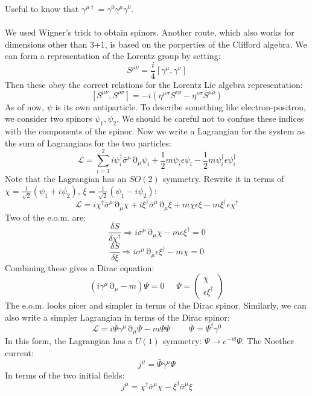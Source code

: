 \documentclass[12 pt]{article}
\DeclareMathOperator {\p} {\partial}
\begin{document}
Useful to know that $\gamma^{\mu \dagger} = \gamma^0 \gamma^{\mu} \gamma^0$.
\\
\\
We used Wigner's trick to obtain spinors. Another route, which also works for dimensions other than 3+1, is based on the porperties of the Clifford algebra. We can form a representation of the Lorentz group by setting:
\[      S^{\mu \nu} = \frac{i}{4} [ \gamma^{\mu} , \gamma^{\nu} ]     \]
Then these obey the correct relations for the Lorentz Lie algebra representation:
\[      [S^{\mu\nu}, S^{\rho \sigma} ] = -i ( \eta^{\mu \sigma} S^{\nu \rho} - \eta^{\nu \sigma} S^{\mu \rho} )       \]
As of now, $\psi$ is its own antiparticle. To describe something like electron-positron, we consider two spinors $\psi_1, \psi_2$. We should be careful not to confuse these indices with the components of the spinor. Now we write a Lagrangian for the system as the sum of Lagrangians for the two particles:
\[      \mathcal{L} = \sum_{i=1}^2 i \psi_i^{\dagger} \bar \sigma^{\mu} \p_{\mu} \psi_i + \frac{1}{2} m \psi_i \epsilon \psi_i - \frac{1}{2} m \psi_i^{\dagger} \epsilon \psi_i^{\dagger}          \]
Note that the Lagrangian has an $SO(2)$ symmetry. Rewrite it in terms of $\chi = \frac{1}{\sqrt{2}} (\psi_1 + i \psi_2)$, $\xi = \frac{1}{\sqrt{2}} (\psi_1 - i \psi_2)$:
\[    \mathcal{L} = i \chi^{\dagger} \bar \sigma^{\mu} \p_{\mu} \chi + i \xi^{\dagger} \bar \sigma^{\mu} \p_{\mu} \xi + m \chi \epsilon \xi - m \xi^{\dagger} \epsilon \chi^{\dagger}     \]
Two of the e.o.m. are:
\[    \frac{\delta S}{\delta \chi^{\dagger}} \Rightarrow i \bar \sigma^{\mu} \p_{\mu} \chi - m \epsilon \xi^{\dagger} = 0   \]
\[    \frac{\delta S}{\delta \xi}   \Rightarrow i \sigma^{\mu} \p_{\mu} \epsilon \xi^{\dagger} - m \chi = 0           \]
Combining these gives a Dirac equation:
\[    (i \gamma^{\mu} \p_{\mu} - m )  \Psi = 0 \;\;\;\;\;    \Psi = \left( \begin{array} {c}  \chi \\ \epsilon \xi^{\dagger}  \end{array} \right)   \]
The e.o.m. looks nicer and simpler in terms of the Dirac spinor. Similarly, we can also write a simpler Lagrangian in terms of the Dirac spinor:
\[       \mathcal{L} = i \bar \Psi \gamma^{\mu} \p_{\mu} \Psi - m \bar \Psi \Psi   \;\;\;\;\;\;\;\; \bar \Psi = \Psi^{\dagger} \gamma^0   \]
In this form, the Lagrangian has a $U(1)$ symmetry: $\Psi \to e^{-i\theta} \Psi$. The Noether current:
\[     j^{\mu} = \bar \Psi \gamma^{\mu} \Psi       \]
In terms of the two initial fields:
\[     j^{\mu} = \chi^{\dagger} \bar \sigma^{\mu} \chi - \xi^{\dagger} \bar \sigma^{\mu} \xi      \]
\end{document}
